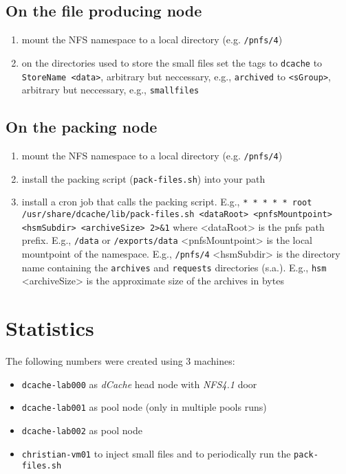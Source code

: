 \documentclass[a4paper,8pt]{scrartcl}
\begin{document}
\subsection{On the file producing node}
\begin{enumerate}
  \item mount the NFS namespace to a local directory (e.g. \texttt{/pnfs/4})
  \item on the directories used to store the small files set the tags
     to \texttt{dcache}
     to \texttt{StoreName <data>}, arbitrary but neccessary, e.g., \texttt{archived}
     to \texttt{<sGroup>}, arbitrary but neccessary, e.g., \texttt{smallfiles}
\end{enumerate}

\subsection{On the packing node}
\begin{enumerate}
  \item mount the NFS namespace to a local directory (e.g. \texttt{/pnfs/4})
  \item install the packing script (\texttt{pack-files.sh}) into your path
  \item install a cron job that calls the packing script. E.g., 
    \subitem \texttt{*  *  *  *  * root /usr/share/dcache/lib/pack-files.sh <dataRoot> <pnfsMountpoint> <hsmSubdir> <archiveSize> 2>\&1}
    \subitem where <dataRoot> is the pnfs path prefix. E.g., \texttt{/data} or \texttt{/exports/data}
    \subitem <pnfsMountpoint> is the local mountpoint of the namespace. E.g., \texttt{/pnfs/4}
    \subitem <hsmSubdir> is the directory name containing the \texttt{archives} and \texttt{requests} directories (s.a.). E.g., \texttt{hsm}
    \subitem <archiveSize> is the approximate size of the archives in bytes
\end{enumerate}

\section{Statistics}
The following numbers were created using 3 machines:
\begin{itemize}
  \item \texttt{dcache-lab000} as \emph{dCache} head node with \emph{NFS4.1} door
  \item \texttt{dcache-lab001} as pool node (only in multiple pools runs)
  \item \texttt{dcache-lab002} as pool node
  \item \texttt{christian-vm01} to inject small files and to periodically run the \texttt{pack-files.sh}
\end{itemize}
\end{document}
